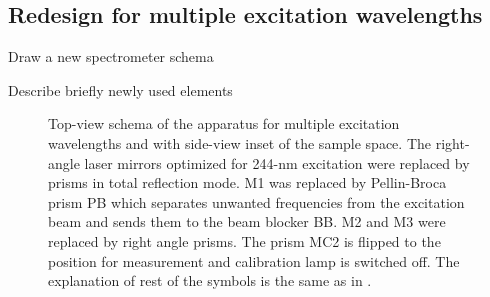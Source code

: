 \subsection{Redesign for multiple excitation wavelengths}
\begin{docitemize}
	\item Draw a new spectrometer schema
	\item Describe briefly newly used elements
\end{docitemize}

\begin{figure}
	\centering
	
	\caption{Top-view schema of the apparatus for multiple excitation wavelengths
		and with side-view inset of the sample space. The right-angle laser
		mirrors optimized for 244-nm excitation were replaced by prisms in total
		reflection mode. M1 was replaced by Pellin-Broca prism PB which separates
		unwanted frequencies from the excitation beam and sends them to the beam
		blocker BB. M2 and M3 were replaced by right angle prisms. The prism MC2 is
		flipped to the position for measurement and calibration lamp is switched
		off. The explanation of rest of the symbols is the same as in
		.}
	\label{\figlabel{mutliple_excitations:aparatus_schema}}
\end{figure}
